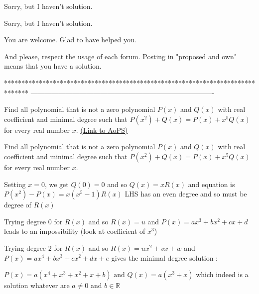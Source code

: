 \begin{solution}
	Sorry, but I haven't solution.
\end{solution}



\begin{solution}
	\begin{tcolorbox}Sorry, but I haven't solution.\end{tcolorbox}
You are welcome.
Glad to have helped you.

And please, respect the usage of each forum. Posting in "proposed and own" means that you have a solution.
\end{solution}
*******************************************************************************
-------------------------------------------------------------------------------

\begin{problem}
	Find all polynomial that is not a zero polynomial $P(x)$ and $Q(x)$ with real coefficient and minimal degree such that
$P(x^2)+ Q(x) = P(x) + x^5Q(x)$
for every real number $x$.
	\flushright \href{https://artofproblemsolving.com/community/c6h619099}{(Link to AoPS)}
\end{problem}



\begin{solution}
	\begin{tcolorbox}Find all polynomial that is not a zero polynomial $P(x)$ and $Q(x)$ with real coefficient and minimal degree such that
$P(x^2)+ Q(x) = P(x) + x^5Q(x)$
for every real number $x$.\end{tcolorbox}
Setting $x=0$, we get $Q(0)=0$ and so $Q(x)=xR(x)$ and equation is $P(x^2)-P(x)=x(x^5-1)R(x)$
LHS has an even degree and so must be degree of $R(x)$

Trying degree 0 for $R(x)$ and so $R(x)=u$ and $P(x)=ax^3+bx^2+cx+d$ leads to an impossibility (look at coefficient of $x^3$)

Trying degree 2 for $R(x)$ and so $R(x)=ux^2+vx+w$ and $P(x)=ax^4+bx^3+cx^2+dx+e$ gives the minimal degree solution :

$\boxed{P(x)=a(x^4+x^3+x^2+x+b)\text{  and  }Q(x)=a(x^3+x)}$ which indeed is a solution whatever are $a\ne 0$ and $b\in\mathbb R$
\end{solution}



